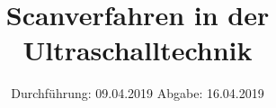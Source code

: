 

\subject{US2}
\title{Scanverfahren in der Ultraschalltechnik}
\date{%
  Durchführung: 09.04.2019
  \hspace{3em}
  Abgabe: 16.04.2019
}



\maketitle
\thispagestyle{empty}
\tableofcontents
\newpage







\printbibliography{}


